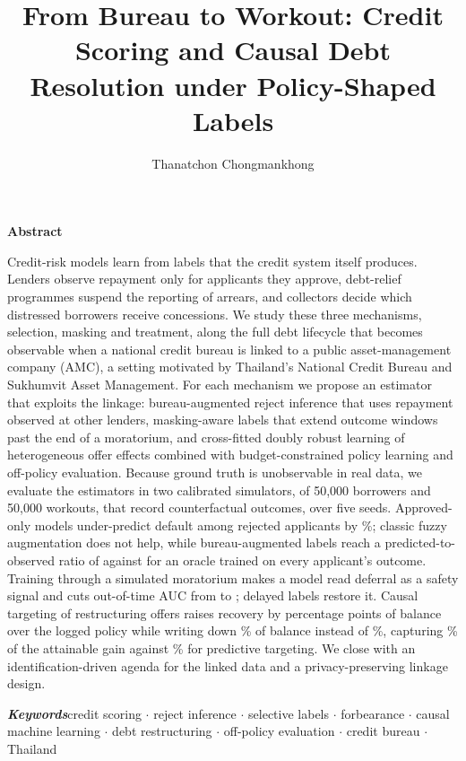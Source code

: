 \documentclass[10pt]{article}
\title{From Bureau to Workout: Credit Scoring and Causal Debt Resolution under Policy-Shaped Labels}
\author{Thanatchon Chongmankhong}
\renewenvironment{abstract}{%
  \begin{center}\textbf{\large Abstract}\end{center}\vspace{-4pt}
  \list{}{\leftmargin=0.45in\rightmargin=0.45in}\item\relax\small}{\endlist}
\begin{document}
\maketitle
\thispagestyle{firstpage}

\begin{abstract}
Credit-risk models learn from labels that the credit system itself produces. Lenders observe repayment only for applicants they approve, debt-relief programmes suspend the reporting of arrears, and collectors decide which distressed borrowers receive concessions. We study these three mechanisms, selection, masking and treatment, along the full debt lifecycle that becomes observable when a national credit bureau is linked to a public asset-management company (AMC), a setting motivated by Thailand's National Credit Bureau and Sukhumvit Asset Management. For each mechanism we propose an estimator that exploits the linkage: bureau-augmented reject inference that uses repayment observed at other lenders, masking-aware labels that extend outcome windows past the end of a moratorium, and cross-fitted doubly robust learning of heterogeneous offer effects combined with budget-constrained policy learning and off-policy evaluation. Because ground truth is unobservable in real data, we evaluate the estimators in two calibrated simulators, of 50,000 borrowers and 50,000 workouts, that record counterfactual outcomes, over five seeds. Approved-only models under-predict default among rejected applicants by \EtwoAoUnder\%; classic fuzzy augmentation does not help, while bureau-augmented labels reach a predicted-to-observed ratio of \EtwoRejBa{} against \EtwoRejOracle{} for an oracle trained on every applicant's outcome. Training through a simulated moratorium makes a model read deferral as a safety signal and cuts out-of-time AUC from \EthreeAUCtwoDelay{} to \EthreeAUCtwoNaive{}; delayed labels restore it. Causal targeting of restructuring offers raises recovery by \RtwoGainDR{} percentage points of balance over the logged policy while writing down \RtwoWdCausDR\% of balance instead of \RtwoWdSq\%, capturing \RtwoShareDR\% of the attainable gain against \RtwoSharePred\% for predictive targeting. We close with an identification-driven agenda for the linked data and a privacy-preserving linkage design.
\end{abstract}

\vspace{2pt}
{\small\textbf{\textit{Keywords}}\enspace credit scoring $\cdot$ reject inference $\cdot$ selective labels $\cdot$ forbearance $\cdot$ causal machine learning $\cdot$ debt restructuring $\cdot$ off-policy evaluation $\cdot$ credit bureau $\cdot$ Thailand}
\end{document}
